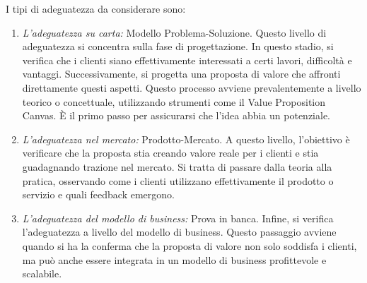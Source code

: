 I tipi di adeguatezza da considerare sono:
\begin{enumerate}
    \item \textit{L'adeguatezza su carta:} Modello Problema-Soluzione. Questo livello di adeguatezza si concentra sulla fase di progettazione. In questo stadio, si verifica che i clienti siano effettivamente interessati a certi lavori, difficoltà e vantaggi. Successivamente, si progetta una proposta di valore che affronti direttamente questi aspetti. Questo processo avviene prevalentemente a livello teorico o concettuale, utilizzando strumenti come il Value Proposition Canvas. È il primo passo per assicurarsi che l'idea abbia un potenziale.
    \item \textit{L'adeguatezza nel mercato:} Prodotto-Mercato. A questo livello, l’obiettivo è verificare che la proposta stia creando valore reale per i clienti e stia guadagnando trazione nel mercato. Si tratta di passare dalla teoria alla pratica, osservando come i clienti utilizzano effettivamente il prodotto o servizio e quali feedback emergono.
    \item \textit{L'adeguatezza del modello di business:} Prova in banca. Infine, si verifica l’adeguatezza a livello del modello di business. Questo passaggio avviene quando si ha la conferma che la proposta di valore non solo soddisfa i clienti, ma può anche essere integrata in un modello di business profittevole e scalabile.
\end{enumerate}